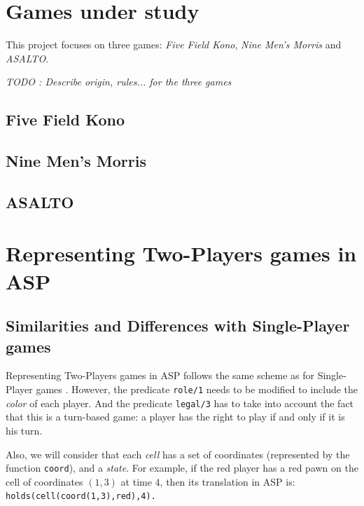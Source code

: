 \documentclass[12pt,twoside]{report}
\begin{document}
\section{Games under study}

This project focuses on three games: \textit{Five Field Kono}, \textit{Nine Men's Morris} and \textit{ASALTO}.

\bigskip

\emph{TODO : Describe origin, rules... for the three games}


\subsection{Five Field Kono}



\subsection{Nine Men's Morris}

\subsection{ASALTO}

\section{Representing Two-Players games in ASP}

\subsection{Similarities and Differences with Single-Player games}

Representing Two-Players games in ASP follows the same scheme as for Single-Player games \cite{thielscher2009answer}. However, the predicate \texttt{role/1} needs to be modified to include the \textit{color} of each player. And the predicate \texttt{legal/3} has to take into account the fact that this is a turn-based game: a player has the right to play if and only if it is his turn.

\bigskip

Also, we will consider that each \textit{cell} has a set of coordinates (represented by the function \texttt{coord}), and a \textit{state}. For example, if the red player has a red pawn on the cell of coordinates $(1,3)$ at time $4$, then its translation in ASP is: \texttt{holds(cell(coord(1,3),red),4).}
\end{document}
